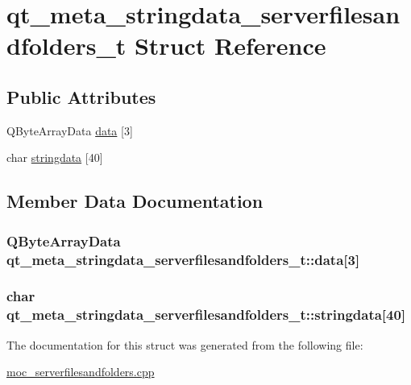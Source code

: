 \hypertarget{structqt__meta__stringdata__serverfilesandfolders__t}{\section{qt\-\_\-meta\-\_\-stringdata\-\_\-serverfilesandfolders\-\_\-t Struct Reference}
\label{structqt__meta__stringdata__serverfilesandfolders__t}
}
\subsection*{Public Attributes}
\begin{DoxyCompactItemize}
\item 
Q\-Byte\-Array\-Data \hyperlink{structqt__meta__stringdata__serverfilesandfolders__t_aba7a4986d682eb552793224a7c74f047}{data} \mbox{[}3\mbox{]}
\item 
char \hyperlink{structqt__meta__stringdata__serverfilesandfolders__t_aea3bef9a45824b148c5a22f269708a71}{stringdata} \mbox{[}40\mbox{]}
\end{DoxyCompactItemize}


\subsection{Member Data Documentation}
\hypertarget{structqt__meta__stringdata__serverfilesandfolders__t_aba7a4986d682eb552793224a7c74f047}{
\subsubsection[{data}]{\setlength{\rightskip}{0pt plus 5cm}Q\-Byte\-Array\-Data qt\-\_\-meta\-\_\-stringdata\-\_\-serverfilesandfolders\-\_\-t\-::data\mbox{[}3\mbox{]}}}\label{structqt__meta__stringdata__serverfilesandfolders__t_aba7a4986d682eb552793224a7c74f047}
\hypertarget{structqt__meta__stringdata__serverfilesandfolders__t_aea3bef9a45824b148c5a22f269708a71}{
\subsubsection[{stringdata}]{\setlength{\rightskip}{0pt plus 5cm}char qt\-\_\-meta\-\_\-stringdata\-\_\-serverfilesandfolders\-\_\-t\-::stringdata\mbox{[}40\mbox{]}}}\label{structqt__meta__stringdata__serverfilesandfolders__t_aea3bef9a45824b148c5a22f269708a71}


The documentation for this struct was generated from the following file\-:\begin{DoxyCompactItemize}
\item 
\hyperlink{moc__serverfilesandfolders_8cpp}{moc\-\_\-serverfilesandfolders.\-cpp}\end{DoxyCompactItemize}
